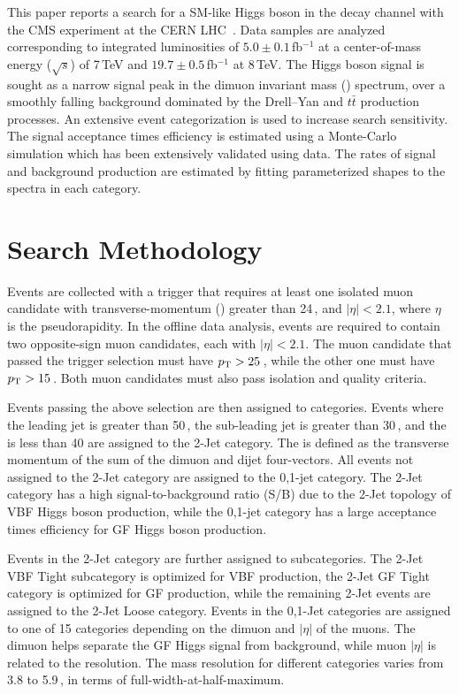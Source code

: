 \documentclass[10pt]{article}
\begin{document}
This paper reports a search for a SM-like Higgs boson in the \mm{} decay channel 
with the CMS experiment at the CERN LHC~\cite{CMS:2013aga}.  
Data samples are analyzed corresponding to integrated luminosities of 
$5.0\pm0.1$\,fb$^{-1}$ at a center-of-mass energy ($\sqrt{s}$) of
7\,TeV and $19.7\pm0.5$\,fb$^{-1}$ at 8\,TeV.
The Higgs boson signal is sought as a narrow signal peak in the 
dimuon invariant mass (\Mmumu{}) spectrum, over a smoothly falling
background dominated by the Drell--Yan and $t\bar{t}$ production processes.  
An extensive event categorization is used to increase search sensitivity.  
The signal acceptance times efficiency is estimated using a Monte-Carlo
simulation which has been extensively validated using data.
The rates of signal and background production are estimated by fitting 
parameterized shapes to the \Mmumu{} spectra in each category.

\section{Search Methodology}

Events are collected with a trigger that requires at least one
isolated muon candidate with transverse-momentum (\pt) greater than 24\,\GeVc{},
and $|\eta|<2.1$, where $\eta$ is the pseudorapidity.  In the offline
data analysis, events are required to contain two opposite-sign
muon candidates, each with $|\eta|<2.1$.  The muon candidate that passed 
the trigger selection must have $p_{\mathrm{T}}{}>25$\,\GeVc{}, while the other one must 
have $p_{\mathrm{T}}>15$\,\GeVc{}. Both muon candidates must also pass isolation and quality 
criteria.

Events passing the above selection are then assigned to categories.  Events
where the leading jet \pt{} is greater than 50\,\GeVc{}, the sub-leading
jet \pt{} is greater than 30\,\GeVc{}, and the \ptmiss{} is less than 40\GeVc{} 
are assigned to the 2-Jet category.  The \ptmiss{} is defined as the transverse
momentum of the sum of the dimuon and dijet four-vectors.
All events not assigned to the 2-Jet category are assigned to the 0,1-jet category.
The 2-Jet category has a high signal-to-background ratio (S/B) due to the 2-Jet
topology of VBF Higgs boson production, while the 0,1-jet category has a large
acceptance times efficiency for GF Higgs boson production.

Events in the 2-Jet category are further assigned to subcategories.  The 2-Jet
VBF Tight subcategory is optimized for VBF production, the 2-Jet GF Tight
category is optimized for GF production, while the remaining 2-Jet events
are assigned to the 2-Jet Loose category.  Events in the 0,1-Jet categories
are assigned to one of 15 categories depending on the dimuon \pt and $|\eta|$
of the muons.  The dimuon \pt{} helps separate the GF Higgs signal from background,
while muon $|\eta|$ is related to the \Mmumu{} resolution.  The \Mmumu{}
mass resolution for different categories varies from 3.8 to 5.9\,\GeVcc{}, 
in terms of full-width-at-half-maximum.
\end{document}
